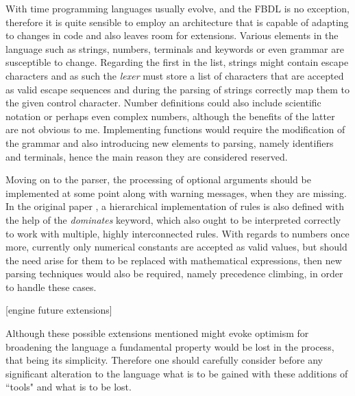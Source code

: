 With time programming languages usually evolve, and the FBDL is no exception, therefore it is quite sensible to employ an architecture that is capable of adapting to changes in code and also leaves room for extensions. Various elements in the language such as strings, numbers, terminals and keywords or even grammar are susceptible to change. Regarding the first in the list, strings might contain escape characters and as such the \textit{lexer} must store a list of characters that are accepted as valid escape sequences and during the parsing of strings correctly map them to the given control character. Number definitions could also include scientific notation or perhaps even complex numbers, although the benefits of the latter are not obvious to me. Implementing functions would require the modification of the grammar and also introducing new elements to parsing, namely identifiers and terminals, hence the main reason they are considered reserved.

Moving on to the parser, the processing of optional arguments should be implemented at some point along with warning messages, when they are missing. In the original paper \cite{pillerkovacs2015}, a hierarchical implementation of rules is also defined with the help of the \textit{dominates} keyword, which also ought to be interpreted correctly to work with multiple, highly interconnected rules. With regards to numbers once more, currently only numerical constants are accepted as valid values, but should the need arise for them to be replaced with mathematical expressions, then new parsing techniques would also be required, namely precedence climbing, in order to handle these cases.

[engine future extensions]

Although these possible extensions mentioned might evoke optimism for broadening the language a fundamental property would be lost in the process, that being its simplicity. Therefore one should carefully consider before any significant alteration to the language what is to be gained with these additions of ``tools" and what is to be lost.